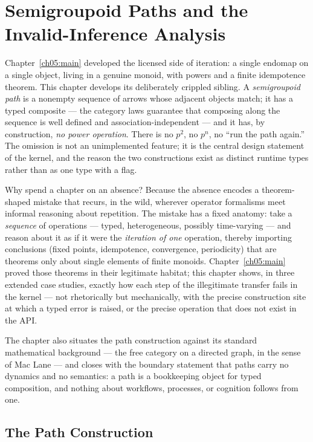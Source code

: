 \chapter{Semigroupoid Paths and the Invalid-Inference Analysis}
\label{ch06:main}

Chapter~\ref{ch05:main} developed the licensed side of iteration: a single
endomap on a single object, living in a genuine monoid, with powers and a
finite idempotence theorem. This chapter develops its deliberately
crippled sibling. A \emph{semigroupoid path} is a nonempty sequence of
arrows whose adjacent objects match; it has a typed composite --- the
category laws guarantee that composing along the sequence is well defined
and association-independent --- and it has, by construction, \emph{no power
operation}. There is no $p^{2}$, no $p^{n}$, no ``run the path again.'' The
omission is not an unimplemented feature; it is the central design
statement of the kernel, and the reason the two constructions exist as
distinct runtime types rather than as one type with a flag.

Why spend a chapter on an absence? Because the absence encodes a theorem-
shaped mistake that recurs, in the wild, wherever operator formalisms meet
informal reasoning about repetition. The mistake has a fixed anatomy: take
a \emph{sequence} of operations --- typed, heterogeneous, possibly
time-varying --- and reason about it as if it were the \emph{iteration of
one} operation, thereby importing conclusions (fixed points, idempotence,
convergence, periodicity) that are theorems only about single elements of
finite monoids. Chapter~\ref{ch05:main} proved those theorems in their
legitimate habitat; this chapter shows, in three extended case studies,
exactly how each step of the illegitimate transfer fails in the kernel ---
not rhetorically but mechanically, with the precise construction site at
which a typed error is raised, or the precise operation that does not
exist in the API.

The chapter also situates the path construction against its standard
mathematical background --- the free category on a directed graph, in the
sense of Mac Lane \cite{maclanecwm} --- and closes with the boundary
statement that paths carry no dynamics and no semantics: a path is a
bookkeeping object for typed composition, and nothing about workflows,
processes, or cognition follows from one.

\section{The Path Construction}
\label{ch06:sec:construction}

